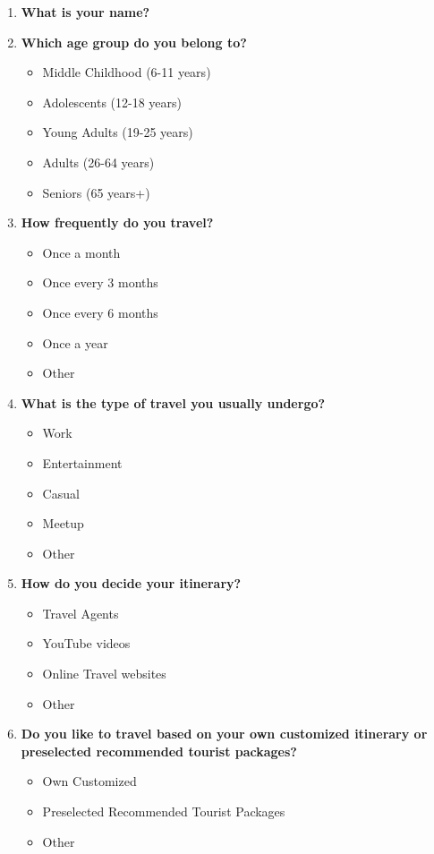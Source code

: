 \documentclass[conference]{IEEEtran}
\begin{document}
\begin{enumerate}
    \item \textbf{What is your name?}
    
    \item \textbf{Which age group do you belong to?}
    \begin{itemize}
        \item Middle Childhood (6-11 years)
        \item Adolescents (12-18 years)
        \item Young Adults (19-25 years)
        \item Adults (26-64 years)
        \item Seniors (65 years+)
    \end{itemize}
    
    \item \textbf{How frequently do you travel?}
    \begin{itemize}
        \item Once a month
        \item Once every 3 months
        \item Once every 6 months
        \item Once a year
        \item Other
    \end{itemize}
    
    \item \textbf{What is the type of travel you usually undergo?}
    \begin{itemize}
        \item Work
        \item Entertainment
        \item Casual
        \item Meetup
        \item Other
    \end{itemize}
    
    \item \textbf{How do you decide your itinerary?}
    \begin{itemize}
        \item Travel Agents
        \item YouTube videos
        \item Online Travel websites
        \item Other
    \end{itemize}
    
    \item \textbf{Do you like to travel based on your own customized itinerary or preselected recommended tourist packages?}
    \begin{itemize}
        \item Own Customized
        \item Preselected Recommended Tourist Packages
        \item Other
    \end{itemize}
    

\end{enumerate}
\end{document}
